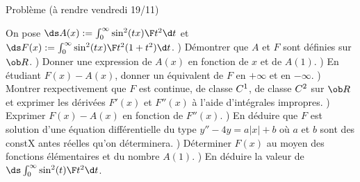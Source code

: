 \bigskip

\bigskip
{}


\bigskip
{}
\bigskip
{}


\centerline{\fourteenbf Problème (à rendre vendredi 19/11)}
\bigskip
\medskip \noindent
On pose $\ds A(x):=\int_0^\infty{\sin^2(tx)\F t^2}\d t$ et $\ds F(x):=\int_0^\infty{\sin^2(tx)\F t^2(1+t^2)}\d t$. 
\medskip
{}) Démontrer que $A$ et $F$ sont définies sur $\ob R$. 
\medskip
{}) Donner une expression de $A(x)$ en fonction de $x$ et de $A(1)$. 
\medskip
{}) En étudiant $F(x)-A(x)$, donner un équivalent de $F$ en $+\infty$ et en $-\infty$. 
\medskip
{}) Montrer rexpectivement que $F$ est continue, de classe $\sc C^1$, de classe $\sc C^2$ sur $\ob R$ et 
exprimer les dérivées $F'(x)$ et $F''(x)$ à l'aide d'intégrales impropres. 
\medskip
{}) Exprimer $F(x)-A(x)$ en fonction de $F''(x)$. 
\medskip
{}) En déduire que $F$ est solution d'une équation différentielle 
du type $y''-4y=a|x|+b$ où $a$ et $b$ sont des constX
antes réelles qu'on déterminera. 
\medskip
{}) Déterminer $F(x)$ au moyen des fonctions élémentaires et du nombre $A(1)$. 
\medskip
{}) En déduire la valeur de $\ds \int_0^\infty{\sin^2(t)\F t^2}\d t$. 

\bye